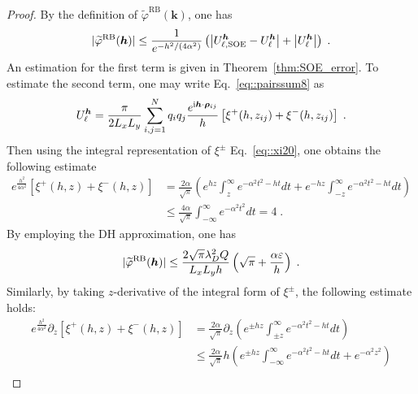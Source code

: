 \begin{proof}
	By the definition of $\widetilde{\varphi}^{\text{RB}}(\bm{k})$, one has
	\begin{equation}
		\lvert \widetilde{\varphi}^{\text{RB}}(\bm{h})\rvert\leq \frac{1}{e^{-h^2/(4\alpha^2)}}\left(\left|U_{\ell,\text{SOE}}^{\bm{h}}-U_{\ell}^{\bm{h}}\right|+\left|U_{\ell}^{\bm{h}}\right|\right)\;.
	\end{equation}
	An estimation for the first term is given in Theorem~\ref{thm:SOE_error}. 
	To estimate the second term, one may write Eq.~\eqref{eq::pairssum8} as
	\begin{equation}
		U_{\ell}^{\bm{h}} = \frac{\pi}{2 L_x L_y} \sum_{i, j = 1}^N q_i q_j \frac{e^{\mathrm{i} \boldsymbol{h} \cdot \boldsymbol{\rho}_{ij}}}{h} \left[ \xi^{+} (h, z_{ij})+\xi^{-} (h, z_{ij}) \right]\;.
	\end{equation}
	Then using the integral representation of $\xi^{\pm}$ Eq.~\eqref{eq::xi20}, one obtains the following estimate
	\begin{equation}\label{eq::118}
		\begin{split}
			e^{\frac{h^2}{4 \alpha^2}} \left[\xi^{+} (h, z)+\xi^{-} (h, z)\right] & = \frac{2\alpha}{\sqrt{\pi}} \left(e^{h z} \int_{z}^{\infty} e^{-\alpha^2 t^2 - ht} dt+e^{-h z} \int_{-z}^{\infty} e^{-\alpha^2 t^2 - ht} dt\right)\\
			& \leq \frac{4\alpha}{\sqrt{\pi}} \int_{- \infty}^{\infty} e^{-\alpha^2 t^2} dt= 4\;.
		\end{split}
	\end{equation}
	By employing the DH approximation, one has
	\begin{equation}
		\lvert \widetilde{\varphi}^{\text{RB}}(\bm{h})\rvert  \leq  \frac{2\sqrt{\pi}\lambda_D^2 Q}{L_xL_y h} \left(\sqrt{\pi} + \frac{\alpha \varepsilon}{h}\right)\;.
	\end{equation}
	Similarly, by taking $z$-derivative of the integral form of $\xi^{\pm}$, the following estimate holds:
	\begin{equation}\label{eq::estiZ}
		\begin{split}
			e^{\frac{h^2}{4 \alpha^2}} \partial_z \left[\xi^{+} (h, z)+\xi^{-} (h, z)\right] & = \frac{2\alpha}{\sqrt{\pi}} \partial_z \left( e^{\pm h z} \int_{\pm z}^{\infty} e^{-\alpha^2 t^2 - ht} dt \right) \\
			& \leq \frac{2\alpha}{\sqrt{\pi}} h \left( e^{\pm h z} \int_{- \infty}^{\infty} e^{-\alpha^2 t^2 - ht} dt + e^{-\alpha^2 z^2} \right) \\

\end{split}
\end{equation}
\end{proof}
